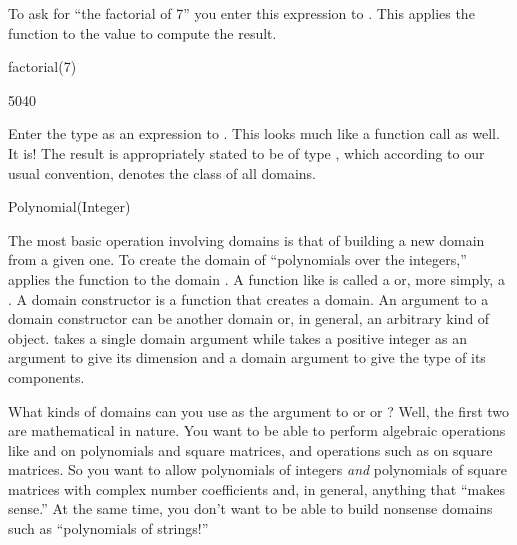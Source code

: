 \begin{xtc}
\begin{xtccomment}
To ask for ``the factorial of 7'' you enter this expression to
\Language{}.
This applies the function  to the value 
to compute the result.
\end{xtccomment}
\begin{spadsrc}
factorial(7)
\end{spadsrc}
\begin{TeXOutput}
\begin{fricasmath}{1}
5040%
\end{fricasmath}
\end{TeXOutput}
\end{xtc}
\begin{xtc}
\begin{xtccomment}
Enter the type  as an expression to
\Language{}.
This looks much like a function call as well.
It is!
The result is appropriately stated to be of type
, which
according to our usual convention, denotes the class of all domains.
\end{xtccomment}
\begin{spadsrc}
Polynomial(Integer)
\end{spadsrc}
\begin{TeXOutput}
\begin{fricasmath}{2}
%
\end{fricasmath}
\end{TeXOutput}
\end{xtc}

The most basic operation involving domains is that of building a new
domain from a given one.
To create the domain of ``polynomials over the integers,'' \Language{}
applies the function  to the domain
.
A function like  is called a  or,
more simply, a
.
A domain constructor is a function that creates a domain.
An argument to a domain constructor can be another domain or, in general,
an arbitrary kind of object.
 takes a single domain argument while
 takes a positive integer as an argument
to give its dimension and
a domain argument to give the type of its components.

What kinds of domains can you use as the argument to
 or  or
?
Well, the first two are mathematical in nature.
You want to be able to perform algebraic operations like
\spadop{+} and \spadop{*} on polynomials and square matrices,
and operations such as  on square matrices.
So you want to allow polynomials of integers {\it and} polynomials
of square matrices with complex number coefficients and, in
general, anything that ``makes sense.'' At the same time, you
don't want \Language{} to be able to build nonsense domains such
as ``polynomials of strings!''

